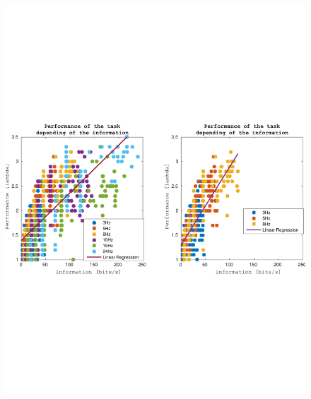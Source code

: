 \documentclass[preprint,12pt]{elsarticle}
\begin{document}
\begin{figure}[htbp]
\includegraphics[width=1\textwidth,trim={0cm 7.5cm 0cm 7.5cm},clip]{figures/scatter_bits_sec_lambda.pdf}
\caption{}
\label{fig:scatterbits}
\end{figure}
\end{document}
